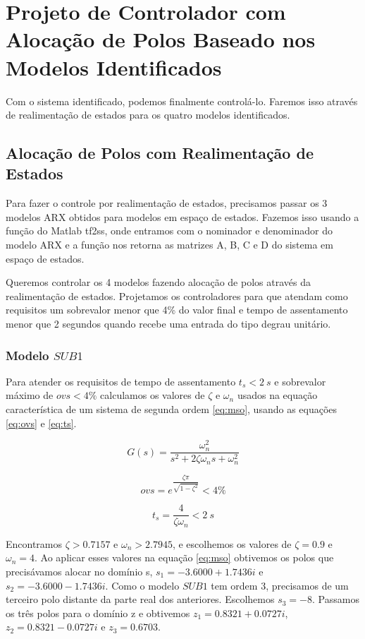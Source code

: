 \chapter{Projeto de Controlador com Alocação de Polos Baseado nos Modelos Identificados} \label{cap5}
Com o sistema identificado, podemos finalmente controlá-lo. Faremos isso através de realimentação de estados para os quatro modelos identificados.

\section{Alocação de Polos com Realimentação de Estados} \label{s:ctrl}
Para fazer o controle por realimentação de estados, precisamos passar os 3 modelos ARX obtidos para modelos em espaço de estados. Fazemos isso usando a função do Matlab tf2ss, onde entramos com o nominador e denominador do modelo ARX e a função nos retorna as matrizes A, B, C e D do sistema em espaço de estados. 


Queremos controlar os 4 modelos fazendo alocação de polos através da realimentação de estados. Projetamos os controladores para que atendam como requisitos um sobrevalor menor que 4\% do valor final e tempo de assentamento menor que 2 segundos quando recebe uma entrada do tipo degrau unitário.

\subsection{Modelo $SUB1$}\label{s:ctrlsub1}

Para atender os requisitos de tempo de assentamento $t_s<2 ~s$ e sobrevalor máximo de $ovs<4\%$ calculamos os valores de $\zeta$ e $\omega_n$ usados na equação característica de um sistema de segunda ordem \eqref{eq:mso}, usando as equações \eqref{eq:ovs} e \eqref{eq:ts}.

\begin{equation}\label{eq:mso}
G(s)=\dfrac{\omega_n^2}{s^2+2 \zeta \omega_n  s+ \omega_n^2}
\end{equation}

\begin{equation}\label{eq:ovs}
ovs=e^{\dfrac{\zeta \pi}{\sqrt{1-\zeta^2}}}<4\%
\end{equation}

\begin{equation}\label{eq:ts}
t_s=\dfrac{4}{\zeta \omega_n}<2~s
\end{equation}

Encontramos $\zeta>0.7157$ e $\omega_n>2.7945$, e escolhemos os valores de $\zeta=0.9$ e $\omega_n=4$. Ao aplicar esses valores na equação \eqref{eq:mso} obtivemos os polos que precisávamos alocar no domínio s, $s_1=-3.6000 + 1.7436i$ e $s_2=-3.6000 - 1.7436i$. Como o modelo $SUB1$ tem ordem 3, precisamos de um terceiro polo distante da parte real dos anteriores. Escolhemos $s_3=-8$. Passamos os três polos para o domínio z e obtivemos $z_1=0.8321 + 0.0727i$, $z_2=0.8321 - 0.0727i$ e $z_3=0.6703$. 


